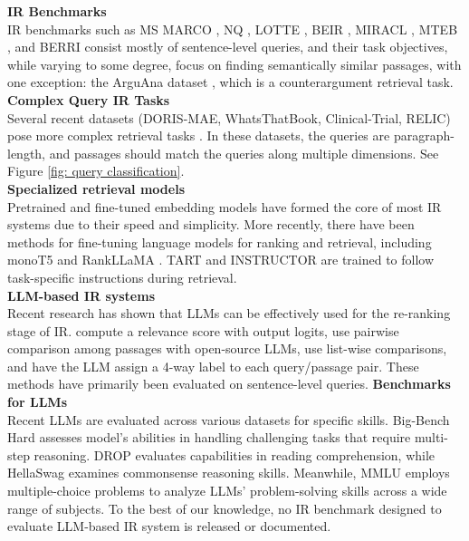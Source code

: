 \documentclass[11pt]{article}
\begin{document}
\textbf{IR Benchmarks}\\
IR benchmarks such as MS MARCO \cite{msmarco}, NQ \cite{nq}, LOTTE \cite{colbertv2}, BEIR \cite{beir}, MIRACL \cite{miracl}, MTEB \cite{mteb}, and BERRI \cite{asai-etal-2023-task} consist mostly of sentence-level queries, and their task objectives, while varying to some degree, focus on finding semantically similar passages, with one exception: the ArguAna dataset \cite{arguana}, which is a counterargument retrieval task.  \\
\textbf{Complex Query IR Tasks}\\
Several recent datasets (DORIS-MAE, WhatsThatBook, Clinical-Trial, RELIC) pose more complex retrieval tasks \cite{dorismae, wtb, clinical-trial, relic}. In these datasets, the queries are paragraph-length, and passages should match the queries along multiple dimensions. See Figure \ref{fig: query classification}. \\
\textbf{Specialized retrieval models}\\
Pretrained \cite{ada, e5, simcse} and fine-tuned \cite{rankcse, diffcse, promptagator, HyDE, exaranker, controlretriever} embedding models have formed the core of most IR systems due to their speed and simplicity. More recently, there have been methods for fine-tuning language models for ranking and retrieval, including monoT5 \cite{monot5} and RankLLaMA \cite{rankllama}. TART \cite{asai-etal-2023-task} and INSTRUCTOR \cite{su-etal-2023-one} are trained to follow task-specific instructions during retrieval.\\
\textbf{LLM-based IR systems}\\
Recent research has shown that LLMs can be effectively used for the re-ranking stage of IR. \citet{qg,helm} compute a relevance score with output logits, \citet{prp} use pairwise comparison among passages with open-source LLMs, \citet{rankgpt, lrl} use list-wise comparisons, and \citet{rg} have the LLM assign a 4-way label to each query/passage pair. These methods have primarily been evaluated on sentence-level queries. 
\textbf{Benchmarks for LLMs}\\
Recent LLMs are evaluated across various datasets for specific skills. Big-Bench Hard \cite{Big_Bench_hard} assesses model’s abilities in handling challenging tasks that require multi-step reasoning. DROP \cite{DROP} evaluates capabilities in reading comprehension, while HellaSwag \cite{Hellaswag} examines commonsense reasoning skills. Meanwhile, MMLU \cite{MMLU} employs multiple-choice problems to analyze LLMs' problem-solving skills across a wide range of subjects. To the best of our knowledge, no IR benchmark designed to evaluate LLM-based IR system is released or documented. 
\end{document}
